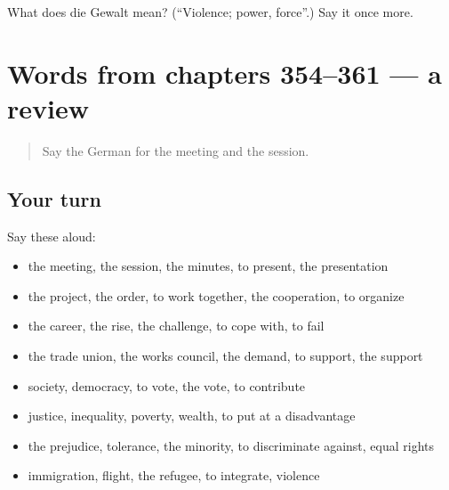 \begin{tcolorbox}[breakable,colback=teal!4,colframe=teal!35!black,title={Before you move on}]
What does die Gewalt mean? (\textquotedblleft{}Violence; power, force\textquotedblright{}.) Say it once more.
\end{tcolorbox}
\section[(dialogue)]{Words from chapters 354–361 — a review}

\label{lesson:GE-R361-review-354-361}



\begin{quote}
Say the German for the meeting and the session.
\end{quote}

\subsection*{Your turn}
Say these aloud:

\begin{itemize}
\raggedright
  \item the meeting, the session, the minutes, to present, the presentation
  \item the project, the order, to work together, the cooperation, to organize
  \item the career, the rise, the challenge, to cope with, to fail
  \item the trade union, the works council, the demand, to support, the support
  \item society, democracy, to vote, the vote, to contribute
  \item justice, inequality, poverty, wealth, to put at a disadvantage
  \item the prejudice, tolerance, the minority, to discriminate against, equal rights
  \item immigration, flight, the refugee, to integrate, violence
\end{itemize}

